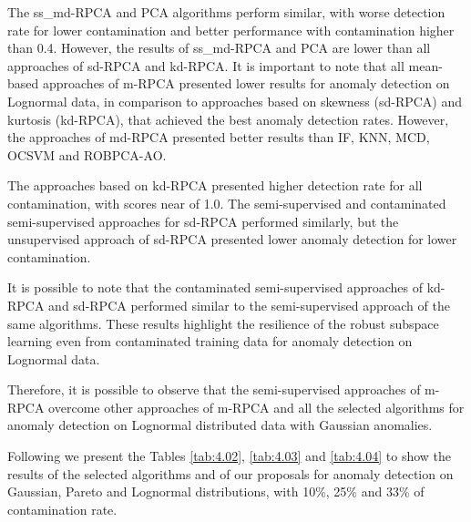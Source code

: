 The ss\_md-RPCA and PCA algorithms perform similar, with worse detection rate for lower contamination and better performance with contamination higher than 0.4. However, the results of ss\_md-RPCA and PCA are lower than all approaches of sd-RPCA and kd-RPCA. It is important to note that all mean-based approaches of m-RPCA presented lower results for anomaly detection on Lognormal data, in comparison to approaches based on skewness (sd-RPCA) and kurtosis (kd-RPCA), that achieved the best anomaly detection rates. However, the approaches of md-RPCA presented better results than IF, KNN, MCD, OCSVM and ROBPCA-AO.

The approaches based on kd-RPCA presented higher detection rate for all contamination, with scores near of 1.0. The semi-supervised and contaminated semi-supervised approaches for sd-RPCA performed similarly, but the unsupervised approach of sd-RPCA presented lower anomaly detection for lower contamination.

It is possible to note that the contaminated semi-supervised approaches of kd-RPCA and sd-RPCA performed similar to the semi-supervised approach of the same algorithms. These results highlight the resilience of the robust subspace learning even from contaminated training data for anomaly detection on Lognormal data.

Therefore, it is possible to observe that the semi-supervised approaches of m-RPCA overcome other approaches of m-RPCA and all the selected algorithms for anomaly detection on Lognormal distributed data with Gaussian anomalies.

Following we present the Tables \ref{tab:4.02}, \ref{tab:4.03} and \ref{tab:4.04} to show the results of the selected algorithms and of our proposals for anomaly detection on Gaussian, Pareto and Lognormal distributions, with 10\%, 25\% and 33\% of contamination rate.


